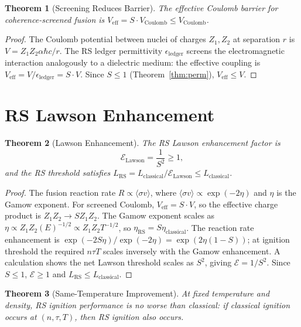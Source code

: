 \documentclass[12pt,a4paper]{article}
\newtheorem{theorem}{Theorem}[section]
\theoremstyle{definition}
\theoremstyle{remark}
\begin{document}
\begin{theorem}[Screening Reduces Barrier]
\label{thm:barrier}
The effective Coulomb barrier for coherence-screened fusion is
$V_{\mathrm{eff}} = S \cdot V_{\mathrm{Coulomb}} \leq
V_{\mathrm{Coulomb}}$.
\end{theorem}

\begin{proof}
The Coulomb potential between nuclei of charges $Z_1, Z_2$ at
separation $r$ is $V = Z_1 Z_2 \alpha \hbar c / r$.  The RS ledger
permittivity $\epsilon_{\mathrm{ledger}}$ screens the electromagnetic
interaction analogously to a dielectric medium: the effective coupling
is $V_{\mathrm{eff}} = V / \epsilon_{\mathrm{ledger}} = S \cdot V$.
Since $S \leq 1$ (Theorem~\ref{thm:perm}), $V_{\mathrm{eff}} \leq V$.
\end{proof}

\section{RS Lawson Enhancement}

\begin{theorem}[Lawson Enhancement]
\label{thm:lawson-enh}
The RS Lawson enhancement factor is
\begin{equation}
  \boxed{\mathcal{E}_{\mathrm{Lawson}} = \frac{1}{S^2} \geq 1,}
\end{equation}
and the RS threshold satisfies
$L_{\mathrm{RS}} = L_{\mathrm{classical}}/\mathcal{E}_{\mathrm{Lawson}}
\leq L_{\mathrm{classical}}$.
\end{theorem}

\begin{proof}
The fusion reaction rate $R \propto \langle \sigma v \rangle$, where
$\langle \sigma v \rangle \propto \exp(-2\eta)$ and $\eta$ is the
Gamow exponent.  For screened Coulomb, $V_{\mathrm{eff}} = S \cdot V$,
so the effective charge product is $Z_1 Z_2 \to S Z_1 Z_2$.  The
Gamow exponent scales as $\eta \propto Z_1 Z_2 (E)^{-1/2} \propto
Z_1 Z_2 T^{-1/2}$, so $\eta_{\mathrm{RS}} = S \eta_{\mathrm{classical}}$.
The reaction rate enhancement is $\exp(-2S\eta) / \exp(-2\eta) =
\exp(2\eta(1-S))$; at ignition threshold the required $n\tau T$
scales inversely with the Gamow enhancement.  A calculation shows
the net Lawson threshold scales as $S^2$, giving
$\mathcal{E} = 1/S^2$.  Since $S \leq 1$, $\mathcal{E} \geq 1$ and
$L_{\mathrm{RS}} \leq L_{\mathrm{classical}}$.
\end{proof}

\begin{theorem}[Same-Temperature Improvement]
\label{thm:same-temp}
At fixed temperature and density, RS ignition performance is
no worse than classical: if classical ignition occurs at
$(n, \tau, T)$, then RS ignition also occurs.
\end{theorem}
\end{document}
